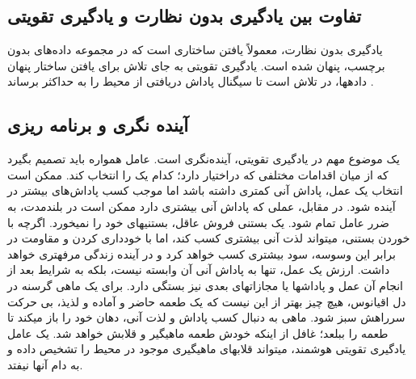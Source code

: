 \subsection*{تفاوت بین یادگیری بدون نظارت و یادگیری تقویتی}
یادگیری بدون نظارت، معمولاً یافتن ساختاری است که در مجموعه داده‌های بدون برچسب، پنهان شده است. یادگیری تقویتی به جای تلاش برای یافتن ساختار پنهان داده\nf ها، در تلاش است تا سیگنال پاداش دریافتی از محیط را به حداکثر برساند
\cite{suttonbook}.


\subsection{آینده نگری و برنامه ریزی}
یک موضوع مهم در یادگیری تقویتی، آینده‌نگری است. عامل همواره باید تصمیم بگیرد که از میان اقدامات مختلفی که دراختیار دارد؛ کدام یک را انتخاب کند. ممکن است انتخاب یک عمل، پاداش آنی کمتری داشته باشد اما موجب کسب پاداش‌های بیشتر در آینده شود. در مقابل، عملی که پاداش آنی بیشتری دارد ممکن است در بلند\nf مدت، به ضرر عامل تمام شود.  یک بستنی فروش عاقل، بستنی\nf های خود را نمی\nf خورد. اگرچه با خوردن بستنی، می\nf تواند لذت  آنی بیشتری کسب کند، اما با خودداری کردن و مقاومت در برابر این وسوسه، سود بیشتری کسب \nf خواهد کرد و در آینده زندگی مرفه\nf تری خواهد داشت.
ارزش یک عمل، تنها به پاداش آنی آن وابسته نیست، بلکه به شرایط بعد از انجام آن عمل و پاداش\nf ها یا مجازات\nf های بعدی نیز بستگی دارد. برای یک ماهی گرسنه در دل اقیانوس، هیچ چیز بهتر از این نیست که یک طعمه حاضر و آماده و لذیذ، بی حرکت سرراهش سبز شود. ماهی به دنبال کسب پاداش و لذت آنی، دهان خود را باز می\nf کند تا طعمه را ببلعد؛ غافل از این\nf که خودش طعمه ماهیگیر و قلابش خواهد شد. یک عامل یادگیری تقویتی هوشمند، می\nf تواند قلاب\nf های ماهیگیری موجود در محیط را تشخیص داده و به دام آن\nf ها نیفتد.



